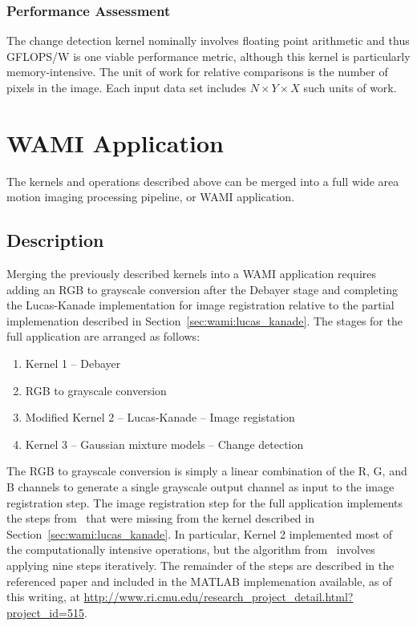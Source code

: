 \documentclass{report}
\begin{document}
\subsubsection{Performance Assessment}

The change detection kernel nominally involves floating point arithmetic and thus
GFLOPS/W is one viable performance metric, although this kernel is particularly
memory-intensive.
The unit of work for relative comparisons is the number of pixels in the image.
Each input data set includes $N \times Y \times X$ such units of work.



\section{WAMI Application}
\label{sec:wami:app}

The kernels and operations described above can be merged into a full
wide area motion imaging processing pipeline, or WAMI application.

\subsection{Description}

Merging the previously described kernels into a WAMI application requires
adding an RGB to grayscale conversion after the Debayer stage and
completing the Lucas-Kanade implementation for image registration relative
to the partial implemenation described in Section~\ref{sec:wami:lucas_kanade}.
The stages for the full application are arranged as follows:

\begin{enumerate}
    \item Kernel 1 -- Debayer
    \item RGB to grayscale conversion
    \item Modified Kernel 2 -- Lucas-Kanade -- Image registation
    \item Kernel 3 -- Gaussian mixture models -- Change detection
\end{enumerate}

The RGB to grayscale conversion is simply a linear combination of the
R, G, and B channels to generate a single grayscale output channel as
input to the image registration step.
The image registration step for the full application implements the
steps from~\cite{BakerMatthews04} that were missing from the kernel
described in Section~\ref{sec:wami:lucas_kanade}.
In particular, Kernel 2 implemented most of the computationally intensive
operations, but the algorithm from~\cite{BakerMatthews04} involves
applying nine steps iteratively.
The remainder of the steps are described in the referenced paper and included
in the MATLAB implemenation available, as of this writing,
at \url{http://www.ri.cmu.edu/research_project_detail.html?project_id=515}.
\end{document}
